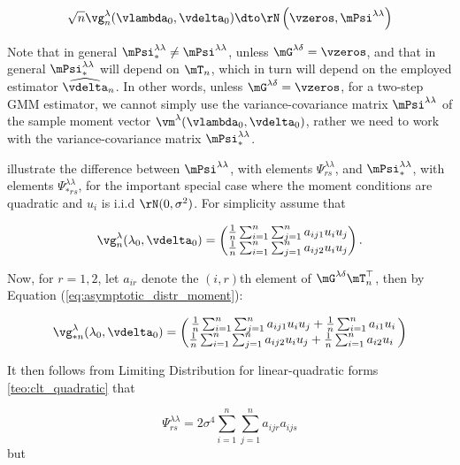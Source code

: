 \documentclass[english,12pt]{book}\usepackage[]{graphicx}\usepackage[]{xcolor}
\begin{document}
\begin{equation*}
\sqrt{n}\vg_{n}^{\lambda}(\vlambda_0, \vdelta_0)\dto \rN\left(\vzeros, \mPsi^{\lambda\lambda}\right)
\end{equation*}

Note that in general $\mPsi_{*}^{\lambda\lambda}\neq \mPsi^{\lambda\lambda}$, unless $\mG^{\lambda\delta} = \vzeros$, and that in general $\mPsi_{*}^{\lambda\lambda}$ will depend on $\mT_n$, which in turn will depend on the employed estimator $\widehat{\vdelta}_n$. In other words, unless $\mG^{\lambda\delta} = \vzeros$, for a two-step GMM estimator, we cannot simply use the variance-covariance matrix $\mPsi^{\lambda\lambda}$ of the sample moment vector $\vm^{\lambda}(\vlambda_0, \vdelta_0)$, rather we need to work with the variance-covariance matrix $\mPsi_{*}^{\lambda\lambda}$.

\cite{pruchaHB} illustrate the difference between $\mPsi^{\lambda\lambda}$, with elements $\Psi_{rs}^{\lambda\lambda}$, and $\mPsi_{*}^{\lambda\lambda}$, with elements $\Psi_{*rs}^{\lambda\lambda}$, for the important special case where the moment conditions are quadratic and $u_i$ is i.i.d $\rN(0, \sigma^2)$. For simplicity assume that

\begin{equation*}
\vg_n^{\lambda}(\lambda_0, \vdelta_0) = \begin{pmatrix}
\frac{1}{n}\sum_{i = 1} ^n\sum_{j = 1} ^na_{ij1}u_iu_j \\
\frac{1}{n}\sum_{i = 1} ^n\sum_{j = 1} ^na_{ij2}u_iu_j
\end{pmatrix}.
\end{equation*}

Now, for $r = 1,2$, let $a_{ir}$ denote the $(i,r)$th element of $\mG^{\lambda\delta}\mT_n^\top$, then by Equation (\ref{eq:asymptotic_distr_moment}):


\begin{equation*}
\vg_{*n}^{\lambda}(\lambda_0, \vdelta_0) = \begin{pmatrix}
\frac{1}{n}\sum_{i = 1} ^n\sum_{j = 1} ^na_{ij1}u_iu_j + \frac{1}{n}\sum_{i=1}^na_{i1}u_i\\
\frac{1}{n}\sum_{i = 1} ^n\sum_{j = 1} ^na_{ij2}u_iu_j + \frac{1}{n}\sum_{i=1}^na_{i2}u_i\
\end{pmatrix}
\end{equation*}

It then follows from Limiting Distribution for linear-quadratic forms \ref{teo:clt_quadratic} that

\begin{equation*}
\Psi_{rs}^{\lambda\lambda} = 2\sigma^4\sum_{i = 1} ^n \sum_{j = 1}^n a_{ijr}a_{ijs} 
\end{equation*}
%
but
\end{document}
